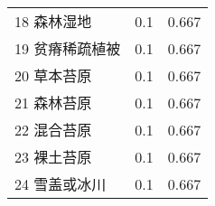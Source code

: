 \begin{table}[htbp]
\begin{tabular}{@{}lcc@{}}
    18 森林湿地               & 0.1                  & 0.667                    \\
    19 贫瘠稀疏植被           & 0.1                  & 0.667                    \\
    20 草本苔原               & 0.1                  & 0.667                    \\
    21 森林苔原               & 0.1                  & 0.667                    \\
    22 混合苔原               & 0.1                  & 0.667                    \\
    23 裸土苔原               & 0.1                  & 0.667                    \\
    24 雪盖或冰川             & 0.1                  & 0.667                    \\ \bottomrule
  \end{tabular}
\end{table}


